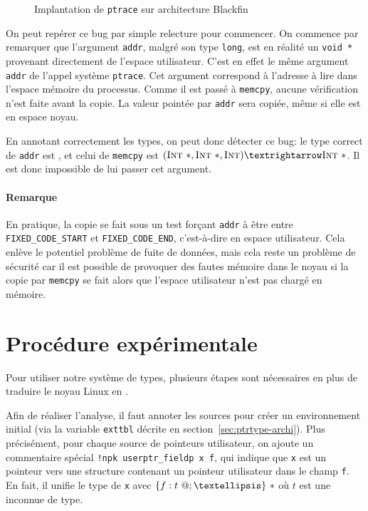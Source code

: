 \begin{figure}
    \caption{Implantation de \texttt{ptrace} sur architecture Blackfin}
    \label{fig:ptrace-blackfin}
\end{figure}


On peut repérer ce bug par simple relecture pour commencer. On commence par
remarquer que l'argument \texttt{addr}, malgré son type \texttt{long}, est en
réalité un \texttt{void *} provenant directement de l'espace utilisateur. C'est
en effet le même argument \texttt{addr} de l'appel système \texttt{ptrace}.
Cet argument correspond à l'adresse à lire dans l'espace mémoire du processus.
Comme il est passé à \texttt{memcpy}, aucune vérification n'est faite avant la
copie. La valeur pointée par \texttt{addr} sera copiée, même si elle est en
espace noyau.

En annotant correctement les types, on peut donc détecter ce bug: le type
correct de \texttt{addr} est \ptrU{\tInt}, et celui de \texttt{memcpy} est
$(\ptrK{\tInt}, \ptrK{\tInt}, \tInt) → \ptrK{\tInt}$. Il est donc impossible de
lui passer cet argument.


\paragraph{Remarque}


En pratique, la copie se fait sous un test forçant \texttt{addr} à être entre
\nolinkurl{FIXED\_CODE\_START} et \texttt{FIXED\_CODE\_END}, c'est-à-dire en
espace utilisateur. Cela enlève le potentiel problème de fuite de données, mais
cela reste un problème de sécurité car il est possible de provoquer des fautes
mémoire dans le noyau si la copie par \texttt{memcpy} se fait alors que l'espace
utilisateur n'est pas chargé en mémoire.

\section{Procédure expérimentale}
\label{sec:demo-unif}

Pour utiliser notre système de types, plusieurs étapes sont nécessaires en plus
de traduire le noyau Linux en \langname{}.

Afin de réaliser l'analyse, il faut annoter les sources pour créer un
environnement initial (via la variable \texttt{exttbl} décrite en
section~\ref{sec:ptrtype-archi}). Plus précisément, pour chaque source de
pointeurs utilisateur, on ajoute un commentaire spécial \texttt{!npk
userptr\_fieldp x f}, qui indique que \texttt{x} est un pointeur vers une
structure contenant un pointeur utilisateur dans le champ \texttt{f}. En fait,
il unifie le type de \texttt{x} avec $\{ f: \ptrU{t} ; … \}~*$ où $t$ est une
inconnue de type.

